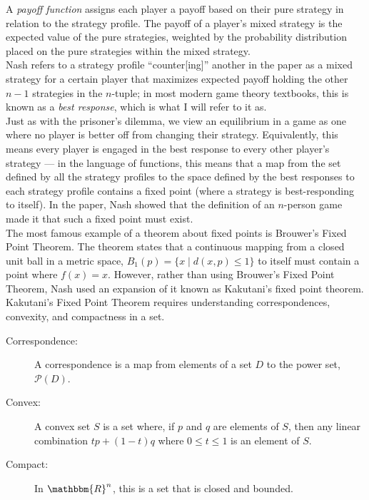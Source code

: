 \documentclass[12pt]{extarticle}
\newcommand{\R}{\mathbbm{R}}
\begin{document}
  A \textit{payoff function} assigns each player a payoff based on their pure strategy in relation to the strategy profile. The payoff of a player's mixed strategy is the expected value of the pure strategies, weighted by the probability distribution placed on the pure strategies within the mixed strategy.\\

  Nash refers to a strategy profile ``counter[ing]'' another in the paper as a mixed strategy for a certain player that maximizes expected payoff holding the other $n-1$ strategies in the $n$-tuple; in most modern game theory textbooks, this is known as a \textit{best response},\supercite{tadelis_game_2023} which is what I will refer to it as.\\

  Just as with the prisoner's dilemma, we view an equilibrium in a game as one where no player is better off from changing their strategy. Equivalently, this means every player is engaged in the best response to every other player's strategy --- in the language of functions, this means that a map from the set defined by all the strategy profiles to the space defined by the best responses to each strategy profile contains a fixed point (where a strategy is best-responding to itself). In the paper, Nash showed that the definition of an $n$-person game made it that such a fixed point must exist.\\

  The most famous example of a theorem about fixed points is Brouwer's Fixed Point Theorem. The theorem states that a continuous mapping from a closed unit ball in a metric space, $B_{1}(p) = \{x\mid d(x,p)\leq 1\}$ to itself must contain a point where $f(x) = x$. However, rather than using Brouwer's Fixed Point Theorem, Nash used an expansion of it known as Kakutani's fixed point theorem. Kakutani's Fixed Point Theorem requires understanding correspondences, convexity, and compactness in a set.
  \begin{description}
    \item[Correspondence:] A correspondence is a map from elements of a set $D$ to the power set, $\mathcal{P}(D)$.
    \item[Convex:] A convex set $S$ is a set where, if $p$ and $q$ are elements of $S$, then any linear combination $tp + (1-t)q$ where $0\leq t \leq 1$ is an element of $S$.\supercite{convex_definition}
    \item[Compact:] In $\R^n$, this is a set that is closed and bounded.
  \end{description}
  
\end{document}
